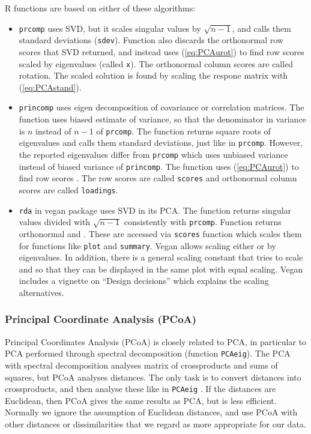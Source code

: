 R functions are based on either of these algorithms:
\begin{itemize}
\item \texttt{prcomp} uses SVD, but it scales singular values by
  $\sqrt{n-1}$, and calls them standard deviations
  (\texttt{sdev}). Function also discards the orthonormal row scores
   that SVD returned, and instead uses (\ref{eq:PCAurot}) to
  find row scores scaled by eigenvalues (called \texttt{x}). The
  orthonormal column scores  are called rotation.  The scaled
  solution is found by scaling the respone matrix with
  (\ref{eq:PCAstand}).
\item \texttt{princomp} uses eigen decomposition of covariance or
  correlation matrices. The function uses biased estimate of variance,
  so that the denominator in variance is $n$ instead of $n-1$ of
  \texttt{prcomp}. The function returns square roots of eigenvalues
  and calls them standard deviations, just like in
  \texttt{prcomp}. However, the reported eigenvalues differ from
  \texttt{prcomp} which uses unbiased variance instead of biased
  variance of \texttt{princomp}.  The function uses (\ref{eq:PCAurot})
  to find row scores . The row scores are called
  \texttt{scores} and orthonormal column scores are called
  \texttt{loadings}.
\item \texttt{rda} in vegan package uses SVD in its PCA. The function
  returns singular values divided with $\sqrt{n-1}$ consistently with
  \texttt{prcomp}.  Function returns orthonormal  and
  . These are accessed via \texttt{scores} function  which
  scales them for
  functions like \texttt{plot} and \texttt{summary}.
  Vegan allows scaling either  or  by
  eigenvalues. In addition, there is a general scaling constant that
  tries to scale  and  so that they can be displayed in
  the same plot with equal scaling. Vegan includes a vignette on
  ``Design decisions'' which explains the scaling alternatives.
\end{itemize}

\subsubsection{Principal Coordinate Analysis (PCoA)}

Principal Coordinates Analysis (PCoA) is closely related to PCA, in
particular to PCA performed through spectral decomposition (function
\texttt{PCAeig}).  The PCA with spectral decomposition analyses matrix
of crossproducts and sums of squares, but PCoA analyses distances.
The only task is to convert distances into crossproducts,
and then analyse these like in \texttt{PCAeig} \citep{Mard79}. If
the distances are Euclidean, then PCoA gives the same results as PCA,
but is less efficient.  Normally we ignore the assumption of Euclidean
distances, and use PCoA with other distances or dissimilarities that
we regard as more appropriate for our data.

